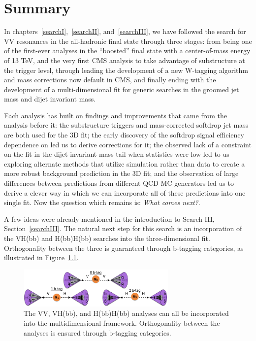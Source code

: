 \clearpage

\chapter{Summary}
\label{sec:searchIII:outlook}
In chapters~\ref{searchI},~\ref{searchII}, and~\ref{searchIII}, we have followed the search for VV resonances in the all-hadronic final state through three stages: from being one of the first-ever analyses in the ``boosted'' final state with a center-of-mass energy of 13 TeV, and the very first CMS analysis to take advantage of substructure at the trigger level, through leading the development of a new W-tagging algorithm and mass corrections now default in CMS, and finally ending with the development of a multi-dimensional fit for generic searches in the groomed jet mass and dijet invariant mass.\par
Each analysis has built on findings and improvements that came from the analysis before it: the substructure triggers and mass-corrected softdrop jet mass are both used for the 3D fit; the early discovery of the softdrop signal efficiency dependence on \PT led us to derive corrections for it; the observed lack of a constraint on the fit in the dijet invariant mass tail when statistics were low led to us exploring alternate methods that utilize simulation rather than data to create a more robust background prediction in the 3D fit; and the observation of large differences between predictions from different QCD MC generators led us to derive a clever way in which we can incorporate all of these predictions into one single fit. 
Now the question which remains is: \emph{What comes next?}.\par
A few ideas were already mentioned in the introduction to Search III, Section~\ref{searchIII}. The natural next step for this search is an incorporation of the VH(bb) and H(bb)H(bb) searches into the three-dimensional fit. Orthogonality between the three is guaranteed through b-tagging categories, as illustrated in Figure~\ref{fig:outlook:vvvhhh}.
\begin{figure}[h!]
\centering
\includegraphics[width=0.69\textwidth]{figures/analysis/search3/misc/VVVHHH.png}
\caption{The VV, VH(bb), and H(bb)H(bb) analyses can all be incorporated into the multidimensional framework. Orthogonality between the analyses is ensured through b-tagging categories.}
\label{fig:outlook:vvvhhh}
\end{figure}
